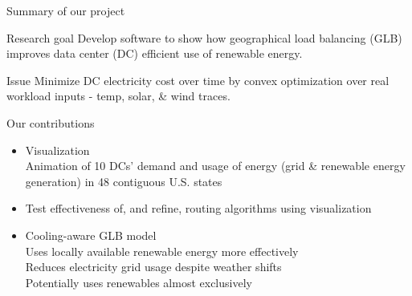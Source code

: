 \documentclass[xcolor=dvipsnames]{beamer}
\begin{document}
\begin{frame}{Summary of our project}

	\begin{block}{Research goal}  
	Develop software to show how geographical load balancing (GLB) improves data center (DC) efficient use of renewable energy.  
	\end{block}
	
	\begin{block}{Issue} 
	Minimize DC electricity cost over time by convex optimization over real workload inputs - temp, solar, \& wind traces.
	\end{block}

	\begin{block}{Our contributions} 
	\begin{itemize}
		\item{Visualization \\ 
		Animation of 10 DCs' demand and usage of energy (grid \& renewable energy generation) in 48 contiguous U.S. states}
		\item{Test effectiveness of, and refine, routing algorithms using visualization}
		\item{Cooling-aware GLB model \\
			Uses locally available renewable energy more effectively \\
			Reduces electricity grid usage despite weather shifts\\
			Potentially uses renewables almost exclusively}
	\end{itemize} 
	\end{block}

\end{frame}
\end{document}
